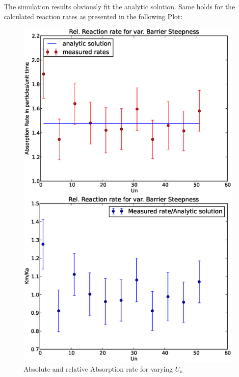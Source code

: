 The simulation results obviously fit the analytic solution. Same holds for the calculated reaction rates as presented in the following Plot:
\begin{figure}[H]
\centering
\begin{minipage}{.5 \textwidth}
    \centering
    \includegraphics[width=.95 \textwidth, keepaspectratio]{plots/cp/un/Kabs.eps}
\end{minipage}\begin{minipage}{.5 \textwidth}
    \includegraphics[width=.95 \textwidth, keepaspectratio]{plots/cp/un/Krel.eps}
\end{minipage}
\caption{Absolute and relative Absorption rate for varying $U_n$}
\label{fig:KUnCP}
\end{figure}


